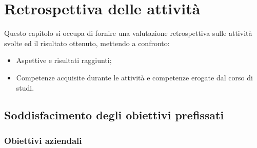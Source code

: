 \chapter{Retrospettiva delle attività}
\label{cap:resoconto}
Questo capitolo si occupa di fornire una valutazione retrospettiva sulle attività svolte ed il risultato ottenuto, mettendo a confronto:
\begin{itemize}
    \item Aspettive e risultati raggiunti;
    \item Competenze acquisite durante le attività e competenze erogate dal corso di studi.
\end{itemize}

\section{Soddisfacimento degli obiettivi prefissati}

\subsection{Obiettivi aziendali}

